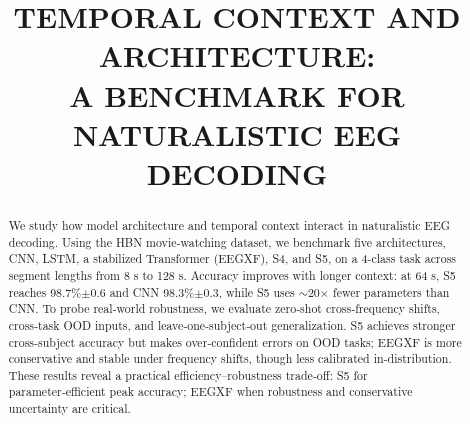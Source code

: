 \documentclass{article}
\title{TEMPORAL CONTEXT AND ARCHITECTURE:\\A BENCHMARK FOR NATURALISTIC EEG DECODING}
\newcommand{\eegtrans}{EEGXF}
\begin{document}
\maketitle

\begin{abstract}
We study how model architecture and temporal context interact in naturalistic EEG decoding. Using the HBN movie‑watching dataset, we benchmark five architectures, CNN, LSTM, a stabilized Transformer (\eegtrans{}), S4, and S5, on a 4-class task across segment lengths from 8 s to 128 s. 
Accuracy improves with longer context: at 64 s, S5 reaches 98.7\%$\pm$0.6 and CNN 98.3\%$\pm$0.3, while S5 uses $\sim$20$\times$ fewer parameters than CNN. To probe real‑world robustness, we evaluate zero‑shot cross‑frequency shifts, cross‑task OOD inputs, and leave‑one‑subject‑out generalization. S5 achieves stronger cross‑subject accuracy but makes over‑confident errors on OOD tasks; \eegtrans{} is more conservative and stable under frequency shifts, though less calibrated in‑distribution. These results reveal a practical efficiency–robustness trade‑off: S5 for parameter‑efficient peak accuracy; \eegtrans{} when robustness and conservative uncertainty are critical. 






\end{abstract}
\end{document}

